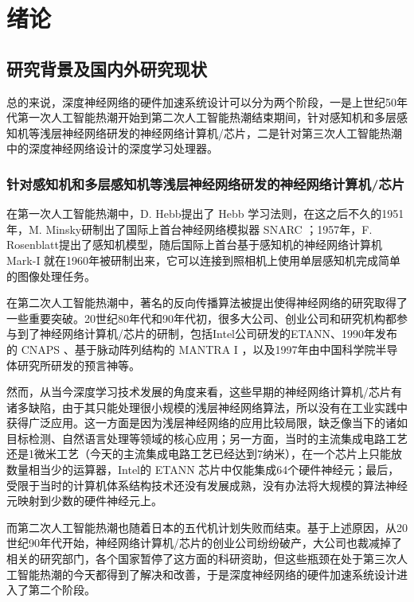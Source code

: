\chapter{绪论}\label{chap:introduction}

\section{研究背景及国内外研究现状}

总的来说，深度神经网络的硬件加速系统设计可以分为两个阶段，一是上世纪50年代第一次人工智能热潮开始到第二次人工智能热潮结束期间，针对感知机和多层感知机等浅层神经网络研发的神经网络计算机/芯片，二是针对第三次人工智能热潮中的深度神经网络设计的深度学习处理器。

\subsection{针对感知机和多层感知机等浅层神经网络研发的神经网络计算机/芯片}

在第一次人工智能热潮中，D. Hebb提出了 Hebb 学习法则，在这之后不久的1951年，M. Minsky研制出了国际上首台神经网络模拟器 SNARC ；1957年，F. Rosenblatt提出了感知机模型，随后国际上首台基于感知机的神经网络计算机 Mark-I 就在1960年被研制出来，它可以连接到照相机上使用单层感知机完成简单的图像处理任务。

在第二次人工智能热潮中，著名的反向传播算法被提出使得神经网络的研究取得了一些重要突破。20世纪80年代和90年代初，很多大公司、创业公司和研究机构都参与到了神经网络计算机/芯片的研制，包括Intel公司研发的ETANN、1990年发布的 CNAPS 、基于脉动阵列结构的 MANTRA I ，以及1997年由中国科学院半导体研究所研发的预言神等。

然而，从当今深度学习技术发展的角度来看，这些早期的神经网络计算机/芯片有诸多缺陷，由于其只能处理很小规模的浅层神经网络算法，所以没有在工业实践中获得广泛应用。这一方面是因为浅层神经网络的应用比较局限，缺乏像当下的诸如目标检测、自然语言处理等领域的核心应用；另一方面，当时的主流集成电路工艺还是1微米工艺（今天的主流集成电路工艺已经达到7纳米），在一个芯片上只能放数量相当少的运算器，Intel的 ETANN 芯片中仅能集成64个硬件神经元；最后，受限于当时的计算机体系结构技术还没有发展成熟，没有办法将大规模的算法神经元映射到少数的硬件神经元上。

而第二次人工智能热潮也随着日本的五代机计划失败而结束。基于上述原因，从20世纪90年代开始，神经网络计算机/芯片的创业公司纷纷破产，大公司也裁减掉了相关的研究部门，各个国家暂停了这方面的科研资助，但这些瓶颈在处于第三次人工智能热潮的今天都得到了解决和改善，于是深度神经网络的硬件加速系统设计进入了第二个阶段。

